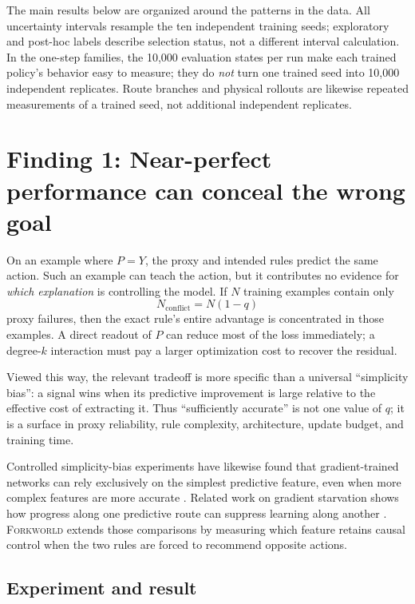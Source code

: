 \documentclass[11pt,a4paper]{article}
\newcommand{\Forkworld}{\textsc{Forkworld}}
\begin{document}
The main results below are organized around the patterns in the data. All uncertainty intervals resample the ten independent training seeds; exploratory and post-hoc labels describe selection status, not a different interval calculation. In the one-step families, the 10,000 evaluation states per run make each trained policy's behavior easy to measure; they do \emph{not} turn one trained seed into 10,000 independent replicates. Route branches and physical rollouts are likewise repeated measurements of a trained seed, not additional independent replicates.

\section*{Finding 1: Near-perfect performance can conceal the wrong goal}

On an example where $P=Y$, the proxy and intended rules predict the same action. Such an example can teach the action, but it contributes no evidence for \emph{which explanation} is controlling the model. If $N$ training examples contain only
\[
N_{\mathrm{conflict}}=N(1-q)
\]
proxy failures, then the exact rule's entire advantage is concentrated in those examples. A direct readout of $P$ can reduce most of the loss immediately; a degree-$k$ interaction must pay a larger optimization cost to recover the residual.

Viewed this way, the relevant tradeoff is more specific than a universal ``simplicity bias'': a signal wins when its predictive improvement is large relative to the effective cost of extracting it. Thus ``sufficiently accurate'' is not one value of $q$; it is a surface in proxy reliability, rule complexity, architecture, update budget, and training time.

Controlled simplicity-bias experiments have likewise found that gradient-trained networks can rely exclusively on the simplest predictive feature, even when more complex features are more accurate \citep{shah2020pitfalls}. Related work on gradient starvation shows how progress along one predictive route can suppress learning along another \citep{pezeshki2021gradient}. \Forkworld{} extends those comparisons by measuring which feature retains causal control when the two rules are forced to recommend opposite actions.

\subsection*{Experiment and result}
\end{document}

